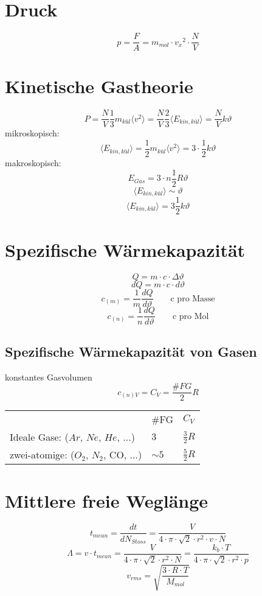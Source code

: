 \section{Druck}
\[ \boxed{p = \frac{F}{A} = m_{mol} \cdot {v_x}^2 \cdot \frac{N}{V}} \]

\section{Kinetische Gastheorie}
\[ P = \frac{N}{V} \frac{1}{3} m_{kül}\langle v^2\rangle  = \frac{N}{V} \frac{2}{3} \langle E_{kin, kül}\rangle  = \frac{N}{V} k \vartheta  \]
mikroskopisch: 
\[ \langle E_{kin, kül}\rangle  = \frac{1}{2} m_{kül} \langle v^2\rangle  = 3 \cdot \frac{1}{2} k \vartheta \]
makroskopisch: 
\[ E_{Gas} = 3 \cdot n \frac{1}{2} R \vartheta\]
\[ \langle E_{kin, kül}\rangle  \sim \vartheta \]
\[ \langle E_{kin, kül}\rangle  = 3 \frac{1}{2} k \vartheta \]

\section{Spezifische Wärmekapazität}
\[ Q = m \cdot c \cdot \Delta \vartheta \]
\[ dQ = m \cdot c \cdot d \vartheta \]
\[ c_{(m)} = \frac{1}{m} \frac{dQ}{d \vartheta} \qquad \text{c pro Masse}\]
\[ c_{(n)} = \frac{1}{n} \frac{dQ}{d \vartheta} \qquad \text{c pro Mol}\]

\subsection{Spezifische Wärmekapazität von Gasen}
konstantes Gasvolumen
\[ c_{(n)V} = C_{V} = \frac{\#FG}{2}R \]
\begin{tabular}{lll}
                                      & \#FG     & $C_V$ \\
Ideale Gase: ($Ar$, $Ne$, $He$, ...)  & $3$      & $\frac{3}{2} R$ \\
zwei-atomige: ($O_2$, $N_2$, CO, ...) & $\sim 5$ & $\frac{5}{2} R$ 
\end{tabular}

\section{Mittlere freie Weglänge}
\[ \boxed{t_{mean} = \frac{d t}{d N_{Stoss}} 
= \frac{V}{4 \cdot \pi \cdot \sqrt{2} \cdot r^2 \cdot v \cdot N}} \]
\[ \boxed{\Lambda = v \cdot t_{mean} 
= \frac{V}{4 \cdot \pi \cdot \sqrt{2} \cdot r^2 \cdot N} 
= \frac{k_b \cdot T}{4 \cdot \pi \cdot \sqrt{2} \cdot r^2 \cdot p}} \]
\[ \boxed{v_{rms} = \sqrt{\frac{3 \cdot R \cdot T}{M_{mol}}}} \]

